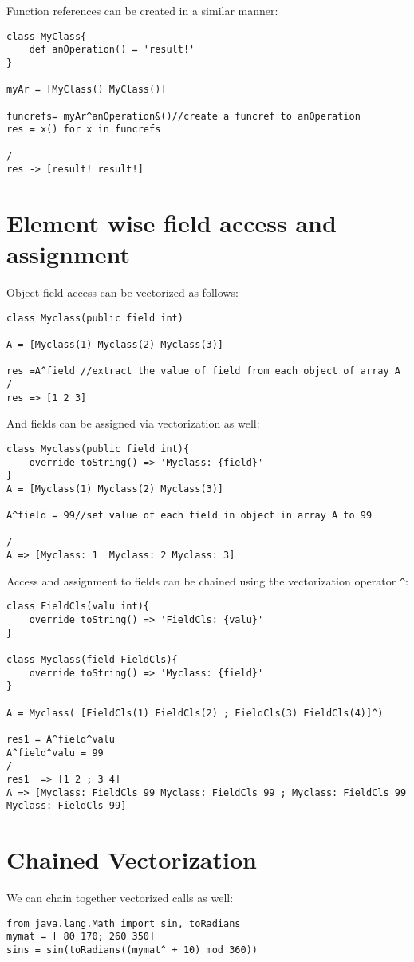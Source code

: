 \documentclass[conc-doc]{subfiles}
\begin{document}
Function references can be created in a similar manner:

\begin{lstlisting}
class MyClass{
	def anOperation() = 'result!'
}

myAr = [MyClass() MyClass()]

funcrefs= myAr^anOperation&()//create a funcref to anOperation
res = x() for x in funcrefs

/
res -> [result! result!]
\end{lstlisting}

\section{Element wise field access and assignment}
Object field access can be vectorized as follows:
\begin{lstlisting}
class Myclass(public field int)

A = [Myclass(1) Myclass(2) Myclass(3)]

res =A^field //extract the value of field from each object of array A
/
res => [1 2 3]
\end{lstlisting}

And fields can be assigned via vectorization as well:
\begin{lstlisting}
class Myclass(public field int){	
	override toString() => 'Myclass: {field}'
}
A = [Myclass(1) Myclass(2) Myclass(3)]

A^field = 99//set value of each field in object in array A to 99

/
A => [Myclass: 1  Myclass: 2 Myclass: 3]
\end{lstlisting}

Access and assignment to fields can be chained using the vectorization operator \lstinline{^}:
\begin{lstlisting}
class FieldCls(valu int){
	override toString() => 'FieldCls: {valu}'
}

class Myclass(field FieldCls){
	override toString() => 'Myclass: {field}'
}

A = Myclass( [FieldCls(1) FieldCls(2) ; FieldCls(3) FieldCls(4)]^) 

res1 = A^field^valu
A^field^valu = 99
/
res1  => [1 2 ; 3 4]
A => [Myclass: FieldCls 99 Myclass: FieldCls 99 ; Myclass: FieldCls 99 Myclass: FieldCls 99]
\end{lstlisting}

\section{Chained Vectorization}
We can chain together vectorized calls as well:
\begin{lstlisting}
from java.lang.Math import sin, toRadians
mymat = [ 80 170; 260 350]
sins = sin(toRadians((mymat^ + 10) mod 360))
\end{lstlisting}
\end{document}
